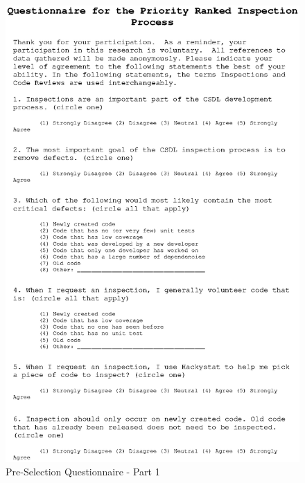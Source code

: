 \begin{figure}[htbp]
  \centering
  \includegraphics[width=1.0\textwidth]{figs/Questionnaire-Pre-shrunk_1.eps}
  \caption{Pre-Selection Questionnaire - Part 1}
  \label{fig:questionnaire-pre1}
\end{figure}

